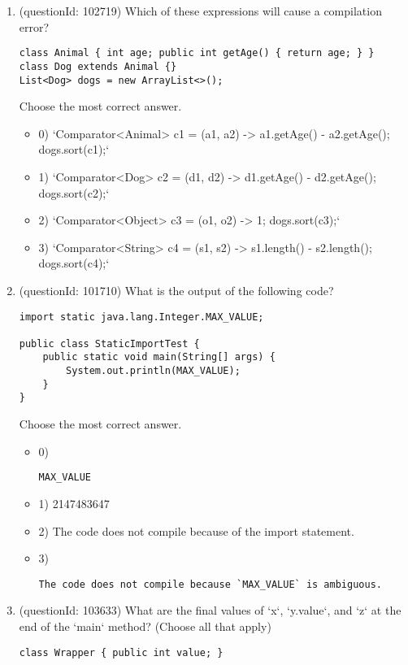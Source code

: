 \documentclass[12pt]{article}
\begin{document}
\begin{enumerate}[label=(\arabic*)]
\begin{itemize}
\end{itemize}
\item (questionId: 102719) Which of these expressions will cause a compilation error?
\begin{verbatim}
class Animal { int age; public int getAge() { return age; } }
class Dog extends Animal {}
List<Dog> dogs = new ArrayList<>();
\end{verbatim}
Choose the most correct answer. 
\begin{itemize}
\item 0) `Comparator<Animal> c1 = (a1, a2) -> a1.getAge() - a2.getAge(); dogs.sort(c1);`

\item 1) `Comparator<Dog> c2 = (d1, d2) -> d1.getAge() - d2.getAge(); dogs.sort(c2);`

\item 2) `Comparator<Object> c3 = (o1, o2) -> 1; dogs.sort(c3);`

\item 3) `Comparator<String> c4 = (s1, s2) -> s1.length() - s2.length(); dogs.sort(c4);`

\end{itemize}
\item (questionId: 101710) What is the output of the following code?\n\begin{verbatim}
import static java.lang.Integer.MAX_VALUE;

public class StaticImportTest {
    public static void main(String[] args) {
        System.out.println(MAX_VALUE);
    }
}
\end{verbatim}
Choose the most correct answer. 
\begin{itemize}
\item 0) \begin{verbatim}MAX_VALUE\end{verbatim}

\item 1) 2147483647

\item 2) The code does not compile because of the import statement.

\item 3) \begin{verbatim}The code does not compile because `MAX_VALUE` is ambiguous.\end{verbatim}

\end{itemize}
\item (questionId: 103633) What are the final values of `x`, `y.value`, and `z` at the end of the `main` method? (Choose all that apply)
\begin{verbatim}
class Wrapper { public int value; }


\end{verbatim}
\end{enumerate}
\end{document}
